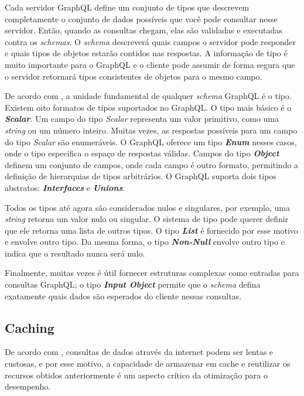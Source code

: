 Cada servidor GraphQL define um conjunto de tipos que descrevem completamente o conjunto de dados possíveis que você pode consultar nesse servidor. Então, quando as consultas chegam, elas são validadas e executadas contra os \textit{schemas}. O \textit{schema} descreverá quais campos o servidor pode responder e quais tipos de objetos estarão contidos nas respostas. A informação de tipo é muito importante para o GraphQL e o cliente pode assumir de forma segura que o servidor retornará tipos consistentes de objetos para o mesmo campo.

De acordo com , a unidade fundamental de qualquer \textit{schema} GraphQL é o tipo. Existem oito formatos de tipos suportados no GraphQL. O tipo mais básico é o \textit{\textbf{Scalar}}. Um campo do tipo \textit{Scalar} representa um valor primitivo, como uma \textit{string} ou um número inteiro. Muitas vezes, as respostas possíveis para um campo  do tipo \textit{Scalar} são enumeráveis. O GraphQL oferece um tipo \textit{\textbf{Enum}} nesses casos, onde o tipo especifica o espaço de respostas válidas. Campos do tipo \textit{\textbf{Object}} definem um conjunto de campos, onde cada campo é outro formato, permitindo a definição de hierarquias de tipos arbitrários. O GraphQL suporta dois tipos abstratos:  \textit{\textbf{Interfaces}} e  \textit{\textbf{Unions}}.

Todos os tipos até agora são considerados nulos e singulares, por exemplo,  uma \textit{string} retorna um valor nulo ou singular. O sistema de tipo pode querer definir que ele retorna uma lista de outros tipos. O tipo \textit{\textbf{List}} é fornecido por esse motivo e envolve outro tipo. Da mesma forma, o tipo \textit{\textbf{Non-Null}} envolve outro tipo e indica que o resultado nunca será nulo.

Finalmente, muitas vezes é útil fornecer estruturas complexas como entradas para consultas GraphQL; o tipo \textit{\textbf{Input Object}} permite que o \textit{schema} defina exatamente quais dados são esperados do cliente nessas consultas.

\subsection{Caching}

De acordo com , consultas de dados através da internet podem ser lentas e custosas, e por esse motivo, a capacidade de armazenar em cache e reutilizar os recursos obtidos anteriormente é um aspecto crítico da otimização para o desempenho.

